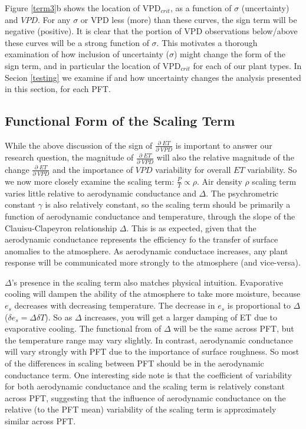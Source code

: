 \documentclass[draft,linenumbers]{agujournal}
\begin{document}
Figure \ref{term3}b shows the location of VPD$_{crit}$, as a function of $\sigma$ (uncertainty) and $VPD$. For any $\sigma$ or VPD less (more) than these curves, the sign term will be negative (positive). It is clear that the portion of VPD observations below/above these curves will be a strong function of $\sigma$. This motivates a thorough examination of how inclusion of uncertainty ($\sigma$) might change the form of the sign term, and in particular the location of VPD$_{crit}$ for each of our plant types. In Secion \ref{testing} we examine if and how uncertainty changes the analysis presented in this section, for each PFT.

\subsection{Functional Form of the Scaling Term}

While the above discussion of the sign of $\frac{\partial \; ET}{\partial \; VPD}$ is important to answer our research question, the magnitude of $\frac{\partial \; ET}{\partial \; VPD}$ will also the relative magnitude of the change $\frac{\partial \; ET}{\partial \; VPD}$ and the importance of $VPD$ variability for overall $ET$ variability. So we now more closely examine the scaling term: $\frac{P}{T} \propto \rho$. Air density $\rho$ scaling term varies little relative to aerodynamic conductance and $\Delta$. The psychrometric constant $\gamma$ is also relatively constant, so the scaling term should be primarily a function of aerodynamic conductance and temperature, through the slope of the Clauisu-Clapeyron relationship $\Delta$. This is as expected, given that the aerodynamic conductance represents the efficiency fo the transfer of surface anomalies to the atmosphere. As aerodynamic conductace  increases, any plant response will be communicated more strongly to the atmosphere (and vice-versa).

$\Delta$'s presence in the scaling term also matches physical intuition. Evaporative cooling will dampen the ability of the atmosphere to take more moisture, because $e_{s}$ decreases with decreasing temperature. The decrease in $e_{s}$ is proportional to $\Delta$ ($\delta e_{s} = \Delta \delta T$). So as $\Delta$ increases, you will get a larger damping of ET due to evaporative cooling.  The functional from of $\Delta$ will be the same across PFT, but the temperature range may vary slightly. In contrast, aerodynamic conductance will vary strongly with PFT due to the importance of surface roughness. So most of the differences in scaling between PFT should be in the aerodynamic conductance term. One interesting side note is that the coefficient of variability for both aerodynamic conductance and the scaling term is relatively constant across PFT, suggesting that the influence of aerodynamic conductance on the relative (to the PFT mean) variability of the scaling term is approximately similar across PFT.
\end{document}

